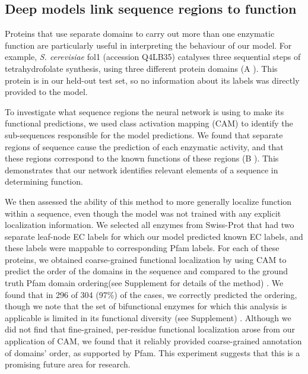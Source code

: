 \subsection*{Deep models link sequence regions to function}
Proteins that use separate domains to carry out more than one enzymatic function are particularly useful in interpreting the behaviour of our model. For example, \textit{S. cerevisiae} fol1 (accession Q4LB35) catalyses three sequential steps of tetrahydrofolate synthesis, using three different protein domains (A%
). This protein is in our held-out test set, so no information about its labels was directly provided to the model.

To investigate what sequence regions the neural network is using to make its functional predictions, we used class activation mapping (CAM) \citep{classactivationmapping} to identify the sub-sequences responsible for the model predictions. We found that separate regions of sequence cause the prediction of each enzymatic activity, and that these regions correspond to the known functions of these regions (B%
).  This demonstrates that our network identifies relevant elements of a sequence in determining function. 


We then assessed the ability of this method to more generally localize function within a sequence, even though the model was not trained with any explicit localization information. We selected all enzymes from Swiss-Prot that had two separate leaf-node EC labels for which our model predicted known EC labels, and these labels were mappable to corresponding Pfam labels. For each of these proteins, we obtained coarse-grained functional localization by using CAM to predict the order of the domains in the sequence and compared to the ground truth Pfam domain ordering\textnormal{(see Supplement for details of the method)}%
. We found that in 296 of 304 (97\%) of the cases, we correctly predicted the ordering, though we note that the set of bifunctional enzymes for which this analysis is applicable is limited in its functional diversity \textnormal{(see Supplement)}%
. Although we did not find that fine-grained, per-residue functional localization arose from our application of CAM, we found that it reliably provided coarse-grained annotation of domains' order, as supported by Pfam. This experiment suggests that this is a promising future area for research.
